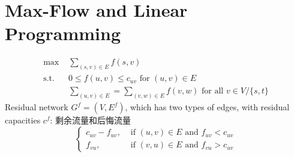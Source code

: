 \documentclass[10pt, a4paper, twocolumn]{article}
\begin{document}
\section{Max-Flow and Linear Programming}
\vspace{-1cm}
\begin{align*}
	\mbox{max } & \sum_{(s,v)\in E}f(s,v) \\
	\mbox{s.t. } & 0\leq f(u,v) \leq c_{uv} \mbox{ for } (u,v)\in E\\
	 & \sum_{(u,v)\in E} = \sum_{(v,w)\in E}f(v,w) \mbox{ for all } v \in V/\{s,t\}
\end{align*}
Residual network $G^f=(V,E^f)$, which has two types of edges, with residual capacities $c^f$: 剩余流量和后悔流量
\begin{equation}
        	\begin{cases}
        	c_{uv} - f_{uv}, & \text{ if } (u,v)\in E \text{ and } f_{uv} < c_{uv}\\
        	f_{vu}, & \text{ if } (v,u)\in E \text{ and } f_{vu} > c_{uv}
        	\end{cases}
        \nonumber 
        \end{equation}
\end{document}

